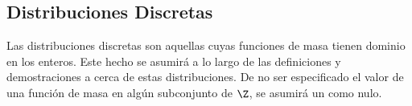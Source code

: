 \subsection{Distribuciones Discretas}
Las distribuciones discretas son aquellas cuyas funciones de masa tienen
dominio en los enteros. Este hecho se asumirá a lo largo de
las definiciones y demostraciones a cerca de estas distribuciones.
De no ser especificado el valor de una función de masa en algún
subconjunto de $\Z$, se asumirá un como nulo.





\clearpage